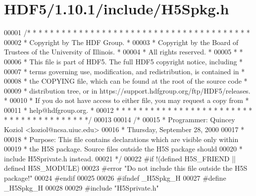 \hypertarget{_h_d_f5_21_810_81_2include_2_h5_spkg_8h_source}{}\section{H\+D\+F5/1.10.1/include/\+H5\+Spkg.h}
\label{_h_d_f5_21_810_81_2include_2_h5_spkg_8h_source}

\begin{DoxyCode}
00001 \textcolor{comment}{/* * * * * * * * * * * * * * * * * * * * * * * * * * * * * * * * * * * * * * *}
00002 \textcolor{comment}{ * Copyright by The HDF Group.                                               *}
00003 \textcolor{comment}{ * Copyright by the Board of Trustees of the University of Illinois.         *}
00004 \textcolor{comment}{ * All rights reserved.                                                      *}
00005 \textcolor{comment}{ *                                                                           *}
00006 \textcolor{comment}{ * This file is part of HDF5.  The full HDF5 copyright notice, including     *}
00007 \textcolor{comment}{ * terms governing use, modification, and redistribution, is contained in    *}
00008 \textcolor{comment}{ * the COPYING file, which can be found at the root of the source code       *}
00009 \textcolor{comment}{ * distribution tree, or in https://support.hdfgroup.org/ftp/HDF5/releases.  *}
00010 \textcolor{comment}{ * If you do not have access to either file, you may request a copy from     *}
00011 \textcolor{comment}{ * help@hdfgroup.org.                                                        *}
00012 \textcolor{comment}{ * * * * * * * * * * * * * * * * * * * * * * * * * * * * * * * * * * * * * * */}
00013 
00014 \textcolor{comment}{/*}
00015 \textcolor{comment}{ * Programmer:  Quincey Koziol <koziol@ncsa.uiuc.edu>}
00016 \textcolor{comment}{ *      Thursday, September 28, 2000}
00017 \textcolor{comment}{ *}
00018 \textcolor{comment}{ * Purpose: This file contains declarations which are visible only within}
00019 \textcolor{comment}{ *      the H5S package.  Source files outside the H5S package should}
00020 \textcolor{comment}{ *      include H5Sprivate.h instead.}
00021 \textcolor{comment}{ */}
00022 \textcolor{preprocessor}{#if !(defined H5S\_FRIEND || defined H5S\_MODULE)}
00023 \textcolor{preprocessor}{#error "Do not include this file outside the H5S package!"}
00024 \textcolor{preprocessor}{#endif}
00025 
00026 \textcolor{preprocessor}{#ifndef \_H5Spkg\_H}
00027 \textcolor{preprocessor}{#define \_H5Spkg\_H}
00028 
00029 \textcolor{preprocessor}{#include "H5Sprivate.h"}

\end{DoxyCode}
